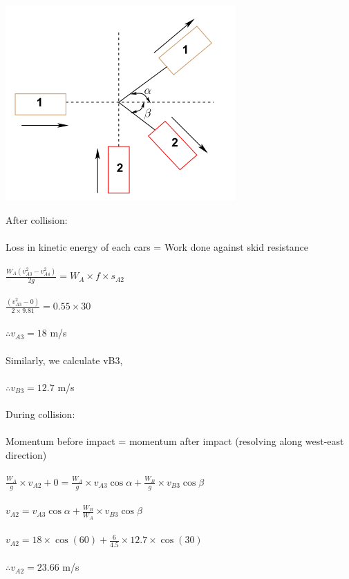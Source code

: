 \begin{center}
	\includegraphics[scale=0.5]{gfx/fig62.png}
\end{center}
After collision:\\\\
Loss in kinetic energy of each cars = Work done against skid resistance\\\\
$ \frac{W_A (v_{A3}^2 - v_{A4}^2)}{2g}  = W_A \times f \times s_{A2} $\\\\
$ \frac{(v_{A3}^2 - 0)}{2 \times 9.81}  = 0.55 \times 30 $\\\\
$ \therefore v_{A3} = 18 $ m/s\\\\
Similarly, we calculate vB3,\\\\
$ \therefore v_{B3} = 12.7 $ m/s\\\\
During collision:\\\\
Momentum before impact = momentum after impact (resolving along west-east direction)\\\\
$ \frac{W_A}{g} \times v_{A2} + 0 = \frac{W_A}{g} \times v_{A3} \cos \alpha + \frac{W_B}{g} \times v_{B3} \cos \beta$\\\\
$ v_{A2} = v_{A3} \cos \alpha + \frac{W_B}{W_A} \times v_{B3} \cos \beta $\\\\
$ v_{A2} = 18 \times \cos(60) + \frac{6}{4.5} \times 12.7 \times \cos(30) $\\\\
$ \therefore v_{A2} = 23.66 $ m/s\\\\
